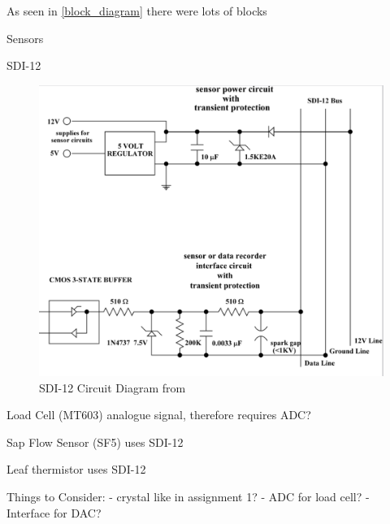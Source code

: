 As seen in \cref{block_diagram} there were lots of blocks


Sensors

SDI-12

\begin{figure}
    \includegraphics[width=\linewidth]{figures/SDI-12 circuit.png}
    \caption{SDI-12 Circuit Diagram from \cite{sdi12_datasheet}}
    \label{sdi12_circuit}
\end{figure}

Load Cell (MT603)
analogue signal, therefore requires ADC?

Sap Flow Sensor (SF5)
uses SDI-12

Leaf thermistor
uses SDI-12

Things to Consider:
- crystal like in assignment 1?
- ADC for load cell?
- Interface for DAC?